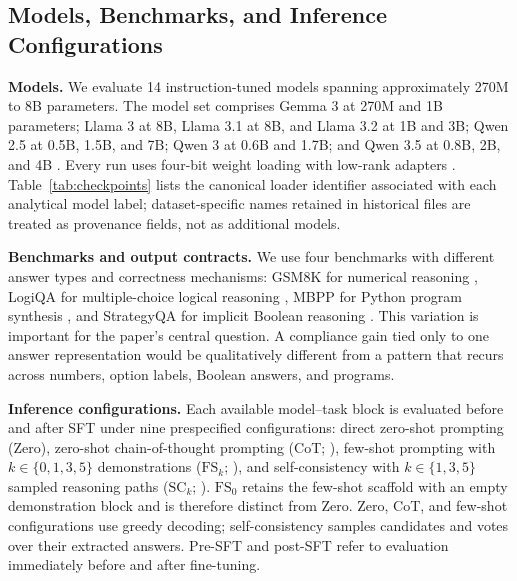 \documentclass{article}
\begin{document}
\subsection{Models, Benchmarks, and Inference Configurations}

\noindent\textbf{Models.}
We evaluate 14 instruction-tuned models spanning approximately 270M to 8B parameters. The model set comprises Gemma 3 at 270M and 1B parameters; Llama 3 at 8B, Llama 3.1 at 8B, and Llama 3.2 at 1B and 3B; Qwen 2.5 at 0.5B, 1.5B, and 7B; Qwen 3 at 0.6B and 1.7B; and Qwen 3.5 at 0.8B, 2B, and 4B \citep{gemmateam2025gemma3,dubey2024llama3,qwenteam2024qwen25,qwenteam2026qwen35,yang2025qwen3}. Every run uses four-bit weight loading with low-rank adapters \citep{dettmers2023qlora}. Table~\ref{tab:checkpoints} lists the canonical loader identifier associated with each analytical model label; dataset-specific names retained in historical files are treated as provenance fields, not as additional models.

\noindent\textbf{Benchmarks and output contracts.}
We use four benchmarks with different answer types and correctness mechanisms: GSM8K for numerical reasoning \citep{cobbe2021training}, LogiQA for multiple-choice logical reasoning \citep{liu2020logiqa}, MBPP for Python program synthesis \citep{austin2021program}, and StrategyQA for implicit Boolean reasoning \citep{geva-etal-2021-aristotle}. This variation is important for the paper's central question. A compliance gain tied only to one answer representation would be qualitatively different from a pattern that recurs across numbers, option labels, Boolean answers, and programs.

\noindent\textbf{Inference configurations.}
Each available model--task block is evaluated before and after SFT under nine prespecified configurations: direct zero-shot prompting (Zero), zero-shot chain-of-thought prompting (CoT; \citealp{kojima2022large}), few-shot prompting with \(k\in\{0,1,3,5\}\) demonstrations (\(\mathrm{FS}_k\); \citealp{brown2020language}), and self-consistency with \(k\in\{1,3,5\}\) sampled reasoning paths (\(\mathrm{SC}_k\); \citealp{wang2023selfconsistency}). \(\mathrm{FS}_0\) retains the few-shot scaffold with an empty demonstration block and is therefore distinct from Zero. Zero, CoT, and few-shot configurations use greedy decoding; self-consistency samples candidates and votes over their extracted answers. Pre-SFT and post-SFT refer to evaluation immediately before and after fine-tuning.
\end{document}
